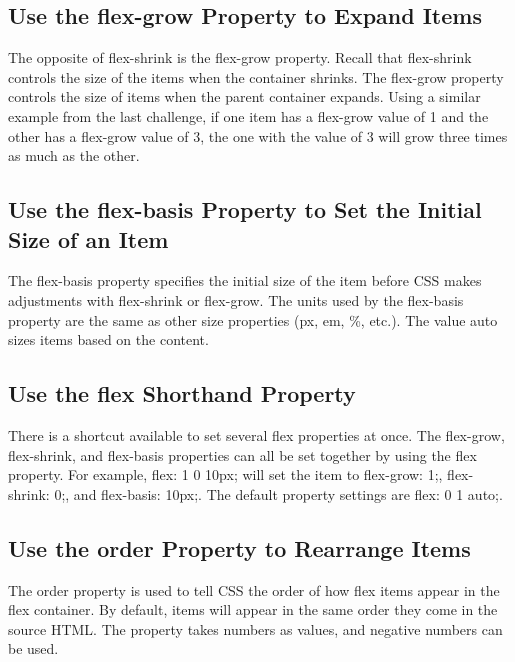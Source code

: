 \documentclass{article}%
\begin{document}
%
\subsection{Use the flex{-}grow Property to Expand Items}%
\label{subsec:Usetheflex{-}growPropertytoExpandItems}%
The opposite of flex{-}shrink is the flex{-}grow property. Recall that flex{-}shrink controls the size of the items when the container shrinks. The flex{-}grow property controls the size of items when the parent container expands.\newline%
Using a similar example from the last challenge, if one item has a flex{-}grow value of 1 and the other has a flex{-}grow value of 3, the one with the value of 3 will grow three times as much as the other.\newline%

%
\subsection{Use the flex{-}basis Property to Set the Initial Size of an Item}%
\label{subsec:Usetheflex{-}basisPropertytoSettheInitialSizeofanItem}%
The flex{-}basis property specifies the initial size of the item before CSS makes adjustments with flex{-}shrink or flex{-}grow.\newline%
The units used by the flex{-}basis property are the same as other size properties (px, em, \%, etc.). The value auto sizes items based on the content.\newline%

%
\subsection{Use the flex Shorthand Property}%
\label{subsec:UsetheflexShorthandProperty}%
There is a shortcut available to set several flex properties at once. The flex{-}grow, flex{-}shrink, and flex{-}basis properties can all be set together by using the flex property.\newline%
For example, flex: 1 0 10px; will set the item to flex{-}grow: 1;, flex{-}shrink: 0;, and flex{-}basis: 10px;.\newline%
The default property settings are flex: 0 1 auto;.\newline%

%
\subsection{Use the order Property to Rearrange Items}%
\label{subsec:UsetheorderPropertytoRearrangeItems}%
The order property is used to tell CSS the order of how flex items appear in the flex container. By default, items will appear in the same order they come in the source HTML. The property takes numbers as values, and negative numbers can be used.\newline%
\end{document}
